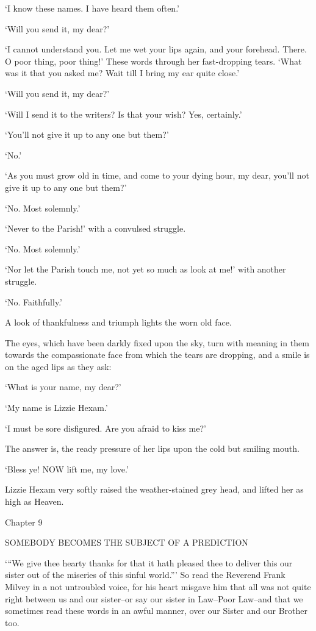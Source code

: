 ‘I know these names. I have heard them often.’

‘Will you send it, my dear?’

‘I cannot understand you. Let me wet your lips again, and your forehead.
There. O poor thing, poor thing!’ These words through her fast-dropping
tears. ‘What was it that you asked me? Wait till I bring my ear quite
close.’

‘Will you send it, my dear?’

‘Will I send it to the writers? Is that your wish? Yes, certainly.’

‘You’ll not give it up to any one but them?’

‘No.’

‘As you must grow old in time, and come to your dying hour, my dear,
you’ll not give it up to any one but them?’

‘No. Most solemnly.’

‘Never to the Parish!’ with a convulsed struggle.

‘No. Most solemnly.’

‘Nor let the Parish touch me, not yet so much as look at me!’ with
another struggle.

‘No. Faithfully.’

A look of thankfulness and triumph lights the worn old face.

The eyes, which have been darkly fixed upon the sky, turn with meaning
in them towards the compassionate face from which the tears are
dropping, and a smile is on the aged lips as they ask:

‘What is your name, my dear?’

‘My name is Lizzie Hexam.’

‘I must be sore disfigured. Are you afraid to kiss me?’

The answer is, the ready pressure of her lips upon the cold but smiling
mouth.

‘Bless ye! NOW lift me, my love.’

Lizzie Hexam very softly raised the weather-stained grey head, and
lifted her as high as Heaven.



Chapter 9

SOMEBODY BECOMES THE SUBJECT OF A PREDICTION


‘“We give thee hearty thanks for that it hath pleased thee to deliver
this our sister out of the miseries of this sinful world.”’ So read the
Reverend Frank Milvey in a not untroubled voice, for his heart misgave
him that all was not quite right between us and our sister--or say our
sister in Law--Poor Law--and that we sometimes read these words in an
awful manner, over our Sister and our Brother too.

